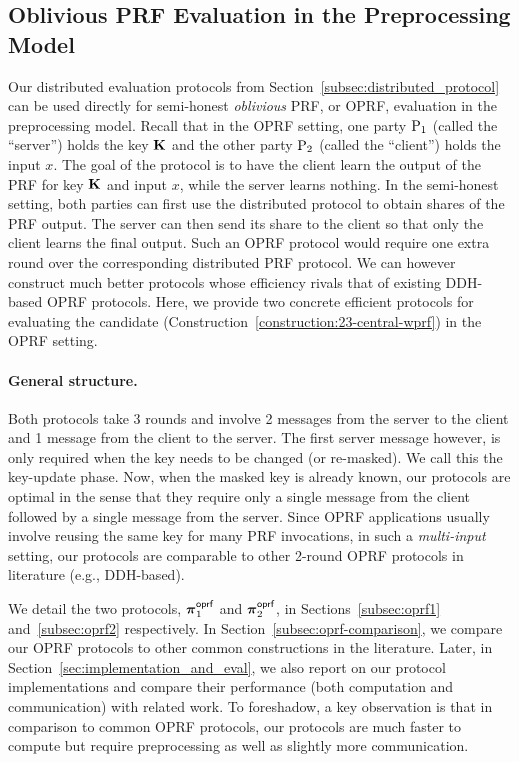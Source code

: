 \iffull
\subsection{Oblivious PRF Evaluation in the Preprocessing Model}
\label{subsec:oprf_protocol}
Our distributed evaluation protocols from Section~\ref{subsec:distributed_protocol} can be used directly for semi-honest \textit{oblivious} PRF, or OPRF, evaluation in the preprocessing model. Recall that in the OPRF setting, one party $\textnormal{P}_1$ (called the ``server'') holds the key $\mat{K}$ and the other party $\textnormal{P}_2$ (called the ``client'') holds the input $x$. The goal of the protocol is to have the client learn the output of the PRF for key $\mat{K}$ and input $x$, while the server learns nothing. In the semi-honest setting, both parties can first use the distributed protocol to obtain shares of the PRF output. The server can then send its share to the client so that only the client learns the final output. Such an OPRF protocol would require one extra round over the corresponding distributed PRF protocol. We can however construct much better protocols whose efficiency rivals that of existing DDH-based OPRF protocols. Here, we provide two concrete efficient protocols for evaluating the \ttwPRF candidate (Construction~\ref{construction:23-central-wprf}) in the OPRF setting. 

\paragraph{General structure.} Both protocols take $3$ rounds and involve 2 messages from the server to the client and 1 message from the client to the server. The first server message however, is only required when the key needs to be changed (or re-masked). We call this the key-update phase. Now, when the masked key is already known, our protocols are optimal in the sense that they require only a single message from the client followed by a single message from the server. Since OPRF applications usually involve reusing the same key for many PRF invocations, in such a \textit{multi-input} setting, our protocols are comparable to other 2-round OPRF protocols in literature (e.g., DDH-based). 

We detail the two protocols, $\boldsymbol{\pi}^{\textsf{oprf}}_1$ and $\boldsymbol{\pi}^{\textsf{oprf}}_2$, in Sections~\ref{subsec:oprf1} and~\ref{subsec:oprf2} respectively. In Section~\ref{subsec:oprf-comparison}, we compare our OPRF protocols to other common constructions in the literature. Later, in Section~\ref{sec:implementation_and_eval}, we also report on our protocol implementations and compare their performance (both computation and communication) with related work. To foreshadow, a key observation is that in comparison to common OPRF protocols, our protocols are much faster to compute but require preprocessing as well as slightly more communication.


